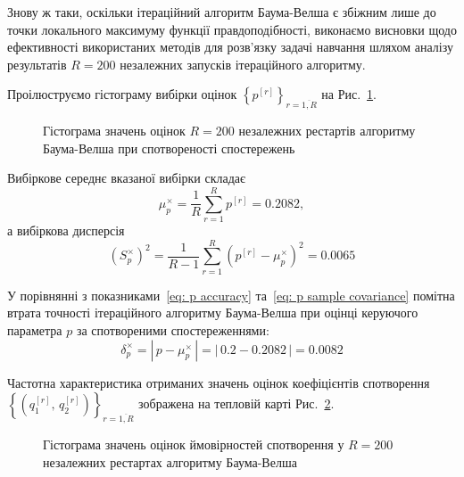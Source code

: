 Знову ж таки, оскільки ітераційний алгоритм Баума-Велша є збіжним лише до точки локального максимуму функції правдоподібності, виконаємо висновки щодо ефективності використаних методів для розв'язку задачі навчання шляхом аналізу результатів $R=200$ незалежних запусків ітераційного алгоритму.

\newpage
Проілюструємо гістограму вибірки оцінок $\left\{ p^{[r]} \right\}_{r=\overline{1,R}}$ на Рис.~\ref{pic: p distortion restarts estimations}.

\begin{figure}[H]\centering
    \setfontsize{14pt}
    
    \caption{Гістограма значень оцінок $R=200$ незалежних рестартів алгоритму Баума-Велша при спотвореності спостережень}
    \label{pic: p distortion restarts estimations}
\end{figure}

Вибіркове середнє вказаної вибірки складає
\begin{equation*}
    \mu^{\times}_p = \frac{1}{R} \sum\limits_{r=1}^R p^{[r]} = 0.2082,
\end{equation*}
а вибіркова дисперсія
\begin{equation*}
    \left( S^{\times}_p \right)^2 = \frac{1}{R-1} \sum\limits_{r=1}^R \left( p^{[r]} - \mu^{\times}_p \right)^2 = 0.0065
\end{equation*}

У порівнянні з показниками~\eqref{eq: p accuracy} та~\eqref{eq: p sample covariance} помітна втрата точності ітераційного алгоритму Баума-Велша при оцінці керуючого параметра $p$ за спотвореними спостереженнями:
\begin{equation*}
    \delta^{\times}_p = \left|\, p-\mu^{\times}_p\, \right| = \left|\, 0.2-0.2082\, \right| = 0.0082
\end{equation*}

\newpage
Частотна характеристика отриманих значень оцінок коефіцієнтів спотворення $\left\{ \left( q^{[r]}_1,\,q^{[r]}_2 \right) \right\}_{r=\overline{1,R}}$ зображена на тепловій карті Рис.~\ref{pic: q distirtion restarts estimations}. 

\begin{figure}[H]\centering
    \setfontsize{14pt}
    
    \caption{Гістограма значень оцінок ймовірностей спотворення у $R=200$ незалежних рестартах алгоритму Баума-Велша}
    \label{pic: q distirtion restarts estimations}
\end{figure}

